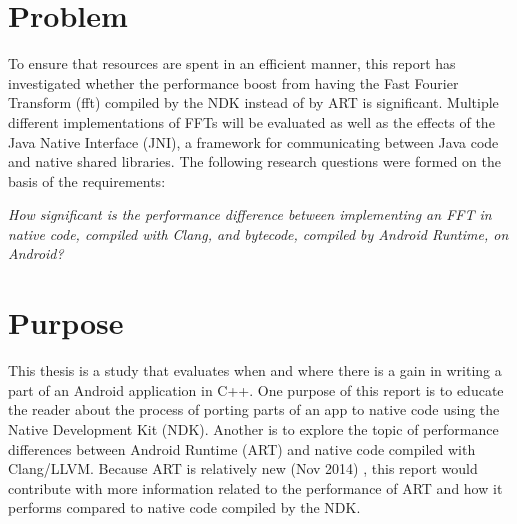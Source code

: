 
\section{Problem}
To ensure that resources are spent in an efficient manner, this report has investigated whether the performance boost from having the Fast Fourier Transform (\gls{fft}) compiled by the NDK instead of by ART is significant. Multiple different implementations of FFTs will be evaluated as well as the effects of the Java Native Interface (JNI), a framework for communicating between Java code and native shared libraries. The following research questions were formed on the basis of the requirements:



\begin{center}
    \textit{How significant is the performance difference between implementing an FFT in native code, compiled with Clang, and bytecode, compiled by Android Runtime, on Android?}
\end{center}


\section{Purpose}
This thesis is a study that evaluates when and where there is a gain in writing a part of an Android application in C++. One purpose of this report is to educate the reader about the process of porting parts of an app to native code using the Native Development Kit (NDK). Another is to explore the topic of performance differences between Android Runtime (ART) and native code compiled with Clang/LLVM. Because ART is relatively new (Nov 2014) \cite{android:dalvik:release}, this report would contribute with more information related to the performance of ART and how it performs compared to native code compiled by the NDK.

